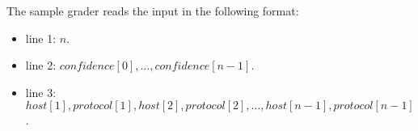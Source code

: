 The sample grader reads the input in the following format:
\begin{itemize}
\item line 1: $n$.
\item line 2: $confidence[0], \ldots, confidence[n - 1]$.
\item line 3: $host[1], protocol[1], host[2], protocol[2], \ldots, host[n - 1], protocol[n - 1]$.
\end{itemize}